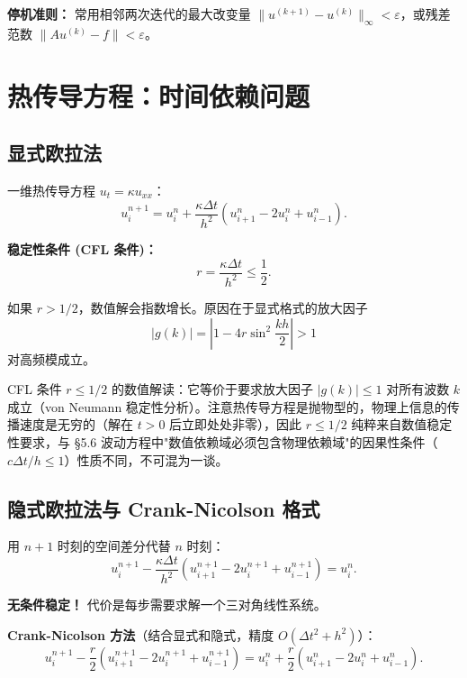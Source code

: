 \textbf{停机准则：} 常用相邻两次迭代的最大改变量 $\|u^{(k+1)}-u^{(k)}\|_\infty < \varepsilon$，或残差范数 $\|Au^{(k)}-f\| < \varepsilon$。

\section{热传导方程：时间依赖问题}
\label{sec:heat_fd}

\subsection{显式欧拉法}

一维热传导方程 $u_t = \kappa u_{xx}$：
\begin{equation}
u_i^{n+1} = u_i^n + \frac{\kappa\Delta t}{h^2}
\left(u_{i+1}^n - 2u_i^n + u_{i-1}^n\right).
\label{eq:explicit_euler}
\end{equation}

\textbf{稳定性条件 (CFL 条件)：}
\begin{equation}
r = \frac{\kappa\Delta t}{h^2} \leq \frac{1}{2}.
\label{eq:cfl_condition}
\end{equation}

如果 $r>1/2$，数值解会指数增长。原因在于显式格式的放大因子
\[
|g(k)| = \left|1 - 4r\sin^2\frac{kh}{2}\right| > 1
\]
对高频模成立。

\begin{insight}
CFL 条件 $r \leq 1/2$ 的数值解读：它等价于要求放大因子 $|g(k)| \leq 1$ 对所有波数 $k$ 成立（von Neumann 稳定性分析）。注意热传导方程是抛物型的，物理上信息的传播速度是无穷的（解在 $t>0$ 后立即处处非零），因此 $r\leq1/2$ 纯粹来自数值稳定性要求，与 \S5.6 波动方程中"数值依赖域必须包含物理依赖域"的因果性条件（$c\Delta t/h \leq 1$）性质不同，不可混为一谈。
\end{insight}

\subsection{隐式欧拉法与 Crank-Nicolson 格式}

用 $n+1$ 时刻的空间差分代替 $n$ 时刻：
\begin{equation}
u_i^{n+1} - \frac{\kappa\Delta t}{h^2}
\left(u_{i+1}^{n+1} - 2u_i^{n+1} + u_{i-1}^{n+1}\right) = u_i^n.
\label{eq:implicit_euler}
\end{equation}

\textbf{无条件稳定！} 代价是每步需要求解一个三对角线性系统。

\textbf{Crank-Nicolson 方法}（结合显式和隐式，精度 $O(\Delta t^2 + h^2)$）：
\begin{equation}
u_i^{n+1} - \frac{r}{2}\left(u_{i+1}^{n+1} - 2u_i^{n+1} + u_{i-1}^{n+1}\right)
= u_i^n + \frac{r}{2}\left(u_{i+1}^n - 2u_i^n + u_{i-1}^n\right).
\label{eq:crank_nicolson}
\end{equation}

